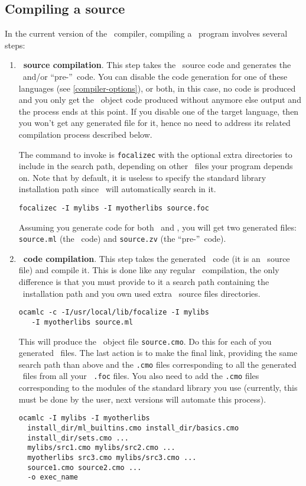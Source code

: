 \subsection{Compiling a source}
In the current version of the \focal\ compiler, compiling a \focal\
program involves several steps:
\begin{enumerate}
  \item {\bf \focal\ source compilation}. This step takes the \focal\
    source code and generates the \ocaml\ and/or ``pre-''\coq\ code.
    You can disable the code generation for one of these languages
    (see \ref{compiler-options}), or both, in this case, no code is
    produced and you only get the \focal\ object code produced without
    anymore else output and the process ends at this point. If you
    disable one of the target language, then you won't get any
    generated file for it, hence no need to address its related
    compilation process described below.

  The command to invoke is {\tt focalizec} with the optional extra
  directories to include in the search path, depending on other
  \focal\ files your program depends on. Note that by default, it is
  useless to specify the standard library installation path since
  \focal\ will automatically search in it.
  \begin{center}
  {\tt focalizec -I mylibs -I myotherlibs source.foc}
  \end{center}
  Assuming you generate code for both \ocaml\ and \coq, you will get
  two generated files: {\tt source.ml} (the \ocaml\ code) and
  {\tt source.zv} (the ``pre-''\coq\ code).

  \item {\bf \ocaml\ code compilation}. This step takes the generated
    \ocaml\ code (it is an \ocaml\ source file) and compile it. This
    is done like any regular \ocaml\ compilation, the only difference
    is that you must provide to it a search path containing the
    \focal\ installation path and you own used extra \focal\ source
    files directories.
    \begin{verbatim}
ocamlc -c -I/usr/local/lib/focalize -I mylibs
   -I myotherlibs source.ml
    \end{verbatim}
    This will produce the \ocaml\ object file {\tt source.cmo}. Do
    this for each of you generated \ocaml\ files. The last action is
    to make the final link, providing the same search path than above
    and the {\tt .cmo} files corresponding to all the generated
    \ocaml\ files from all your \focal\ {\tt .foc} files. You also
    need to add the {\tt .cmo} files corresponding to the modules of
    the standard library you use (currently, this must be done by the
    user, next versions will automate this process).
    \begin{verbatim}
ocamlc -I mylibs -I myotherlibs
  install_dir/ml_builtins.cmo install_dir/basics.cmo
  install_dir/sets.cmo ...
  mylibs/src1.cmo mylibs/src2.cmo ...
  myotherlibs src3.cmo mylibs/src3.cmo ...
  source1.cmo source2.cmo ...
  -o exec_name
    \end{verbatim}


\end{enumerate}
